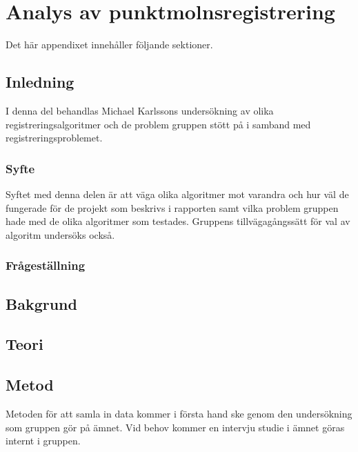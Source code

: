 \chapter{Analys av punktmolnsregistrering}
\label{cha:indiv-report-karlsson}

Det här appendixet innehåller följande sektioner.

\section{Inledning}
\label{sec:introduction-karlsson}

I denna del behandlas Michael Karlssons undersökning av olika registreringsalgoritmer och de problem gruppen stött på i samband med registreringsproblemet.

\subsection{Syfte}
\label{sec:purpose-karlsson}

Syftet med denna delen är att väga olika algoritmer mot varandra och hur väl de fungerade för de projekt som beskrivs i rapporten samt vilka problem gruppen hade med de olika algoritmer som testades. Gruppens tillvägagångssätt för val av algoritm undersöks också.


\subsection{Frågeställning}
\label{sec:issue-karlsson}


\section{Bakgrund}
\label{sec:background-karlsson}


\section{Teori}
\label{sec:theory-karlsson}


\section{Metod}
\label{sec:method-karlsson}

Metoden för att samla in data kommer i första hand ske genom den undersökning som gruppen gör på ämnet. Vid behov kommer en intervju studie i ämnet göras internt i gruppen. 


